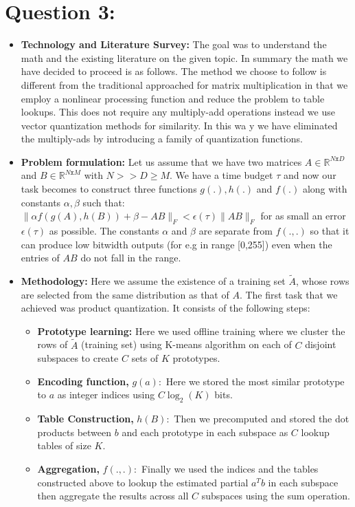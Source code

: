 \documentclass{article}
\begin{document}
\section{Question 3: }
\begin{itemize}
    \item \textbf{Technology and Literature Survey:} The goal was to understand the math and the existing literature on the given topic. In summary the math we have decided to proceed is as follows. The method we choose to follow is different from the traditional approached for matrix multiplication in that we employ a nonlinear processing function and reduce the problem to table lookups. This does not require any multiply-add operations instead we use vector quantization methods for similarity. In this wa y we have eliminated the multiply-ads by introducing a family of quantization functions.
    \item \textbf{Problem formulation:} Let us assume that we have two matrices $A\in \mathbb{R}^{N\texttt{x}D}$ and $B\in \mathbb{R}^{N\texttt{x}M}$ with $N>> D \geq M$. We have a time budget $\tau$ and now our task becomes to construct three functions $g(.), h(.)$ and $f(.)$ along with constants $\alpha, \beta$ such that: $\|\alpha f(g(A),h(B)) + \beta - AB\|_{F} < \epsilon(\tau)\|AB\|_{F}$ for as small an error $\epsilon(\tau)$ as possible. The constants $\alpha$ and $\beta$ are separate from $f(.,.)$ so that it can produce low bitwidth outputs (for e.g in range [0,255]) even when the entries of $AB$ do not fall in the range.\\
    \item \textbf{Methodology:} Here we assume the existence of a training set $\tilde{A}$, whose rows are selected from the same distribution as that of $A$. The first task that we achieved was product quantization. It consists of the following steps: 
    \begin{itemize}
        \item \textbf{Prototype learning:} Here we used offline training where we cluster the rows of $\tilde{A}$ (training set) using K-means algorithm on each of $C$ disjoint subspaces to create $C$ sets of $K$ prototypes.
        \item \textbf{Encoding function,} $g(a):$ Here we stored the most similar prototype to $a$ as integer indices using $C\log_2{(K)}$ bits.
        \item \textbf{Table Construction,} $h(B):$ Then we precomputed and stored the dot products between $b$ and each prototype in each subspace as $C$ lookup tables of size $K$. 
        \item \textbf{Aggregation,} $f(.,.):$ Finally we used the indices and the tables constructed above to lookup the estimated partial $a^{T}b$ in each subspace then aggregate the results across all $C$ subspaces using the sum operation.
    \end{itemize}
    

\end{itemize}
\end{document}
